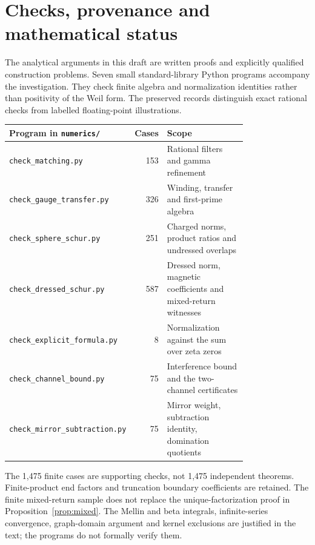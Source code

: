 \section{Checks, provenance and mathematical status}\label{app:checks}
The analytical arguments in this draft are written proofs and explicitly
qualified construction problems. Seven small standard-library Python
programs accompany the investigation. They check finite algebra and
normalization identities rather than positivity of the Weil form.
The preserved records distinguish exact rational checks from labelled
floating-point illustrations.
\begin{center}
\small
\begin{tabular}{p{0.38\linewidth}rp{0.40\linewidth}}
\toprule
Program in \texttt{numerics/} & Cases & Scope \\
\midrule
\texttt{check\_matching.py} & 153 & Rational filters and gamma refinement \\
\texttt{check\_gauge\_transfer.py} & 326 & Winding, transfer and first-prime algebra \\
\texttt{check\_sphere\_schur.py} & 251 & Charged norms, product ratios and undressed overlaps \\
\texttt{check\_dressed\_schur.py} & 587 & Dressed norm, magnetic coefficients and mixed-return witnesses \\
\texttt{check\_explicit\_formula.py} & 8 & Normalization against the sum over zeta zeros \\
\texttt{check\_channel\_bound.py} & 75 & Interference bound and the two-channel certificates \\
\texttt{check\_mirror\_subtraction.py} & 75 & Mirror weight, subtraction identity, domination quotients \\
\bottomrule
\end{tabular}
\end{center}
The 1,475 finite cases are supporting checks, not 1,475 independent
theorems. Finite-product end factors and truncation boundary
coefficients are retained. The finite mixed-return sample does not
replace the unique-factorization proof in Proposition~\ref{prop:mixed}.
The Mellin and beta integrals, infinite-series convergence,
graph-domain argument and kernel exclusions are justified in the text;
the programs do not formally verify them.

